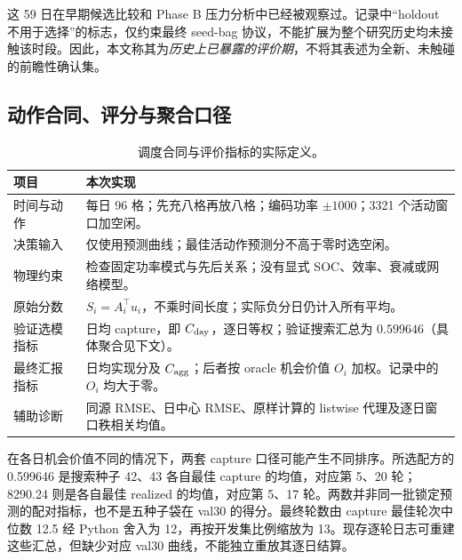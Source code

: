 \documentclass[11pt,a4paper]{article}
\begin{document}
这 59 日在早期候选比较和 Phase B 压力分析中已经被观察过。记录中“holdout 不用于选择”的标志，仅约束最终 seed-bag 协议，不能扩展为整个研究历史均未接触该时段。因此，本文称其为\emph{历史上已暴露的评价期}，不将其表述为全新、未触碰的前瞻性确认集。

\subsection{动作合同、评分与聚合口径}
\EqCapture
\begin{table}[!htbp]\centering\small
\caption{调度合同与评价指标的实际定义。}\label{tab:contract}
\begin{tabularx}{\linewidth}{@{}p{.23\linewidth}X@{}}\toprule
项目 & 本次实现 \\\midrule
时间与动作 & 每日 96 格；先充八格再放八格；编码功率 $\pm1000$；3321 个活动窗口加空闲。 \\
决策输入 & 仅使用预测曲线；最佳活动作预测分不高于零时选空闲。 \\
物理约束 & 检查固定功率模式与先后关系；没有显式 SOC、效率、衰减或网络模型。 \\
原始分数 & $S_i=A_i^\top u_i$，不乘时间长度；实际负分日仍计入所有平均。 \\
验证选模指标 & 日均 capture，即 $C_{\rm day}$，逐日等权；验证搜索汇总为 $0.599646$（具体聚合见下文）。 \\
最终汇报指标 & 日均实现分及 $C_{\rm agg}$；后者按 oracle 机会价值 $O_i$ 加权。记录中的 $O_i$ 均大于零。 \\
辅助诊断 & 同源 RMSE、日中心 RMSE、原样计算的 listwise 代理及逐日窗口秩相关均值。 \\\bottomrule
\end{tabularx}\end{table}
\FloatBarrier
在各日机会价值不同的情况下，两套 capture 口径可能产生不同排序。所选配方的 0.599646 是搜索种子 42、43 各自最佳 capture 的均值，对应第 5、20 轮；8290.24 则是各自最佳 realized 的均值，对应第 5、17 轮。两数并非同一批锁定预测的配对指标，也不是五种子袋在 val30 的得分。最终轮数由 capture 最佳轮次中位数 12.5 经 Python 舍入为 12，再按开发集比例缩放为 13。现存逐轮日志可重建这些汇总，但缺少对应 val30 曲线，不能独立重放其逐日结算。
\end{document}
